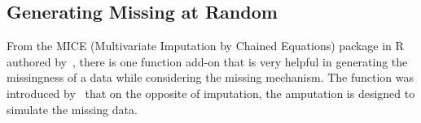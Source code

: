 \documentclass[preprint,12pt]{elsarticle}
\begin{document}
\subsection{Generating Missing at Random}
From the MICE (Multivariate Imputation by Chained Equations) package in R authored by~\citet{van2011mice}, there is one function add-on that is very helpful in generating the missingness of a data while considering the missing mechanism. 
The function was introduced by~\citet{schouten2018generating} that on the opposite of imputation, the amputation is designed to simulate the missing data. 





\newpage



%







\end{document}
